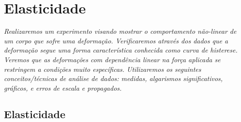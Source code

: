 \chapter{Elasticidade}
\label{Chap:ExpElasticidade}

\begin{fullwidth}\it
	Realizaremos um experimento visando mostrar o comportamento não-linear de um corpo que sofre uma deformação. Verificaremos através dos dados que a deformação segue uma forma característica conhecida como \emph{curva de histerese}. Veremos que as deformações com dependência linear na força aplicada se restringem a condições muito específicas. Utilizaremos os seguintes conceitos/técnicas de análise de dados: medidas, algarismos significativos, gráficos, e erros de escala e propagados.
\end{fullwidth}

\section{Elasticidade}

